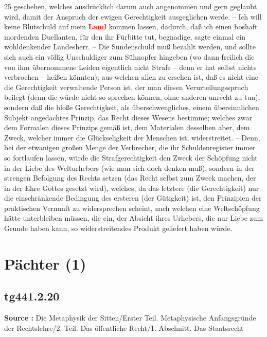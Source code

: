 \documentclass[a4paper,12pt,twoside]{book}
\newcommand{\match}[1]{\textcolor{red}{\textbf{#1}}}
\newcommand{\unnumberedsection}[1]{
	\section*{#1}
	\addcontentsline{toc}{section}{#1}
	\markright{#1}
}
\begin{document}
	
	25
	geschehen, welches ausdrücklich darum auch angenommen und gern geglaubt wird, damit der Anspruch der ewigen Gerechtigkeit ausgeglichen werde. – Ich will keine Blutschuld auf mein \match{Land} kommen lassen, dadurch, daß ich einen boshaft mordenden Duellanten, für den ihr Fürbitte tut, begnadige, sagte einmal ein wohldenkender Landesherr. – Die Sündenschuld muß bezahlt werden, und sollte sich auch ein völlig Unschuldiger zum Sühnopfer  hingeben (wo dann freilich die von ihm übernommene Leiden eigentlich nicht Strafe – denn er hat selbst nichts verbrochen – heißen könnten); aus welchen allen zu ersehen ist, daß es nicht eine die Gerechtigkeit verwaltende Person ist, der man diesen Verurteilungsspruch beilegt (denn die würde nicht so sprechen können, ohne anderen unrecht zu tun), sondern daß die bloße Gerechtigkeit, als überschwengliches, einem übersinnlichen Subjekt angedachtes Prinzip, das Recht dieses Wesens bestimme; welches zwar dem Formalen dieses Prinzips gemäß ist, dem Materialen desselben aber, dem Zweck, welcher immer die Glückseligkeit der Menschen ist, widerstreitet. – Denn, bei der etwanigen großen Menge der Verbrecher, die ihr Schuldenregister immer so fortlaufen lassen, würde die Strafgerechtigkeit den Zweck der Schöpfung nicht in der Liebe des Welturhebers (wie man sich doch denken muß), sondern in der strengen Befolgung des Rechts setzen (das Recht selbst zum Zweck machen, der in der Ehre Gottes gesetzt wird), welches, da das letztere (die Gerechtigkeit) nur die einschränkende Bedingung des ersteren (der Gütigkeit) ist, den Prinzipien der praktischen Vernunft zu widersprechen scheint, nach welchen eine Weltschöpfung hätte unterbleiben müssen, die ein, der Absicht ihres Urhebers, die nur Liebe zum Grunde haben kann, so widerstreitendes Produkt geliefert haben würde. 
	
	\unnumberedsection{Pächter (1)} 
	\subsection*{tg441.2.20} 
	\textbf{Source : }Die Metaphysik der Sitten/Erster Teil. Metaphysische Anfangsgründe der Rechtslehre/2. Teil. Das öffentliche Recht/1. Abschnitt. Das Staatsrecht\\  
	
\end{document}
